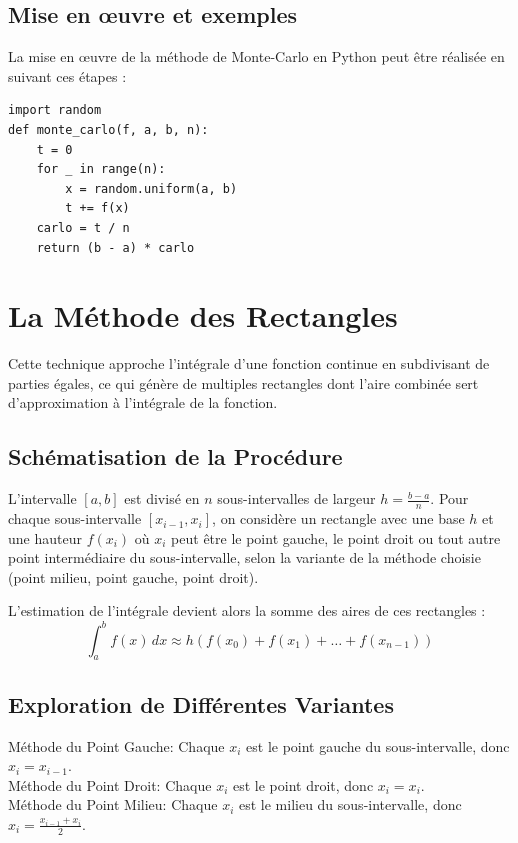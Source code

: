 \documentclass[12pt,a4paper]{article}
\begin{document}
\subsection{Mise en œuvre et exemples}

La mise en œuvre de la méthode de Monte-Carlo en Python peut être réalisée en suivant ces étapes :

\begin{lstlisting}
import random
def monte_carlo(f, a, b, n):
    t = 0
    for _ in range(n):
        x = random.uniform(a, b)
        t += f(x)
    carlo = t / n
    return (b - a) * carlo
\end{lstlisting}
\newpage


\section{La Méthode des Rectangles}
Cette technique approche l'intégrale d'une fonction continue en subdivisant de parties égales, ce qui génère de multiples rectangles dont l'aire combinée sert d'approximation à l'intégrale de la fonction.

\subsection{Schématisation de la Procédure}
L'intervalle $[a, b]$ est divisé en $n$ sous-intervalles de largeur $h = \frac{b-a}{n}$. Pour chaque sous-intervalle $[x_{i-1}, x_i]$, on considère un rectangle avec une base $h$ et une hauteur $f(x_i)$ où $x_i$ peut être le point gauche, le point droit ou tout autre point intermédiaire du sous-intervalle, selon la variante de la méthode choisie (point milieu, point gauche, point droit).

L'estimation de l'intégrale devient alors la somme des aires de ces rectangles :
\[
\int_a^b f(x) \, dx \approx h(f(x_0) + f(x_1) + \dots + f(x_{n-1}))
\]

\subsection{Exploration de Différentes Variantes}
Méthode du Point Gauche: Chaque $x_i$ est le point gauche du sous-intervalle, donc $x_i = x_{i-1}$.\\
Méthode du Point Droit: Chaque $x_i$ est le point droit, donc $x_i = x_i$.\\
Méthode du Point Milieu: Chaque $x_i$ est le milieu du sous-intervalle, donc $x_i = \frac{x_{i-1} + x_i}{2}$.
\end{document}
